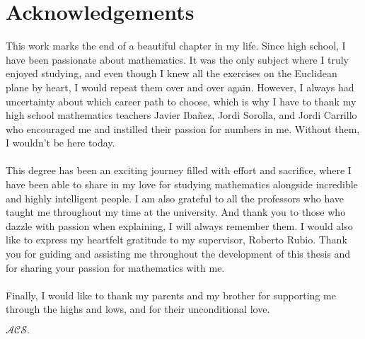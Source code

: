 \documentclass[../../main.tex]{subfiles}
\begin{document}
\chapter*{Acknowledgements} \label{ch:akw} 
\noindent This work marks the end of a beautiful chapter in my life. Since high school, I have been passionate about mathematics. It was the only subject where I truly enjoyed studying, and even though I knew all the exercises on the Euclidean plane by heart, I would repeat them over and over again. However, I always had uncertainty about which career path to choose, which is why I have to thank my high school mathematics teachers Javier Ibañez, Jordi Sorolla, and Jordi Carrillo who encouraged me and instilled their passion for numbers in me. Without them, I wouldn't be here today.\\ \\
\noindent This degree has been an exciting journey filled with effort and sacrifice, where I have been able to share in my love for studying mathematics alongside incredible and highly intelligent people. I am also grateful to all the professors who have taught me throughout my time at the university. And thank you to those who dazzle with passion when explaining, I will always remember them. I would also like to express my heartfelt gratitude to my supervisor, Roberto Rubio. Thank you for guiding and assisting me throughout the development of this thesis and for sharing your passion for mathematics with me.\\ \\
\noindent Finally, I would like to thank my parents and my brother for supporting me through the highs and lows, and for their unconditional love.


\vspace{1cm} \hfill $\mathcal{ACS.}$
\end{document}
